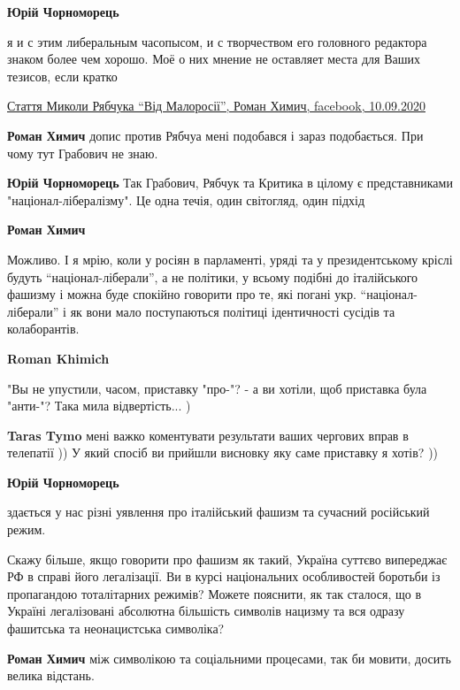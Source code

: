 \begin{itemize}
\begin{itemize}
\textbf{Юрій Чорноморець} 

я и с этим либеральным часопысом, и с творчеством его головного редактора
знаком более чем хорошо. Моё о них мнение не оставляет места для Ваших тезисов,
если кратко

\href{https://www.facebook.com/roman.khimich/posts/3681437128553365}{%
Стаття Миколи Рябчука \enquote{Від Малоросії}, Роман Химич, facebook, 10.09.2020%
}

\textbf{Роман Химич} допис против Рябчуа мені подобався і зараз подобається. При чому тут Грабович не знаю.

\textbf{Юрій Чорноморець} Так Грабович, Рябчук та Критика в цілому є представниками "націонал-лібералізму". Це одна течія, один світогляд, один підхід

\textbf{Роман Химич} 

Можливо. І я мрію, коли у росіян в парламенті, уряді та у президентському
кріслі будуть \enquote{націонал-ліберали}, а не політики, у всьому подібні до
італійського фашизму і можна буде спокійно говорити про те, які погані
укр. \enquote{націонал-ліберали} і як вони мало поступаються політиці ідентичності
сусідів та колаборантів.


\textbf{Roman Khimich} 

"Вы не упустили, часом, приставку "про-"? - а ви хотіли, щоб приставка була
"анти-"? Така мила відвертість... )


\textbf{Taras Tymo} мені важко коментувати результати ваших чергових вправ в телепатії ))
У який спосіб ви прийшли висновку яку саме приставку я хотів? ))

\textbf{Юрій Чорноморець} 

здається у нас різні уявлення про італійський фашизм та сучасний російський режим.

Скажу більше, якщо говорити про фашизм як такий, Україна суттєво випереджає РФ
в справі його легалізації. Ви в курсі національних особливостей боротьби із
пропагандою тоталітарних режимів? Можете пояснити, як так сталося, що в Україні
легалізовані абсолютна більшість символів нацизму та вся одразу фашитська та
неонацистська символіка?

\textbf{Роман Химич} між символікою та соціальними процесами, так би мовити, досить велика відстань.



\end{itemize}
\end{itemize}
